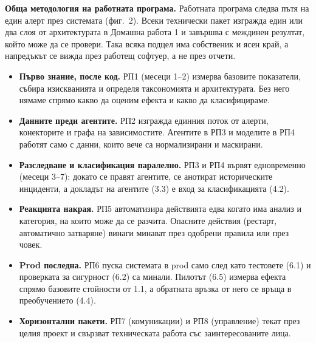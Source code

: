 \documentclass[11pt,a4paper]{article}
\begin{document}
\textbf{Обща методология на работната програма.} Работната програма следва пътя на един алерт през системата (фиг.~2). Всеки технически пакет изгражда един или два слоя от архитектурата в Домашна работа 1 и завършва с междинен резултат, който може да се провери. Така всяка подцел има собственик и ясен край, а напредъкът се вижда през работещ софтуер, а не през отчети.
\begin{itemize}
\item \textbf{Първо знание, после код.} РП1 (месеци 1--2) измерва базовите показатели, събира изискванията и определя таксономията и архитектурата. Без него нямаме спрямо какво да оценим ефекта и какво да класифицираме.
\item \textbf{Данните преди агентите.} РП2 изгражда единния поток от алерти, конекторите и графа на зависимостите. Агентите в РП3 и моделите в РП4 работят само с данни, които вече са нормализирани и маскирани.
\item \textbf{Разследване и класификация паралелно.} РП3 и РП4 вървят едновременно (месеци 3--7): докато се правят агентите, се анотират историческите инциденти, а докладът на агентите (3.3) е вход за класификацията (4.2).
\item \textbf{Реакцията накрая.} РП5 автоматизира действията едва когато има анализ и категория, на които може да се разчита. Опасните действия (рестарт, автоматично затваряне) винаги минават през одобрени правила или през човек.
\item \textbf{Prod последна.} РП6 пуска системата в prod само след като тестовете (6.1) и проверката за сигурност (6.2) са минали. Пилотът (6.5) измерва ефекта спрямо базовите стойности от 1.1, а обратната връзка от него се връща в преобучението (4.4).
\item \textbf{Хоризонтални пакети.} РП7 (комуникации) и РП8 (управление) текат през целия проект и свързват техническата работа със заинтересованите лица.
\end{itemize}
\end{document}
